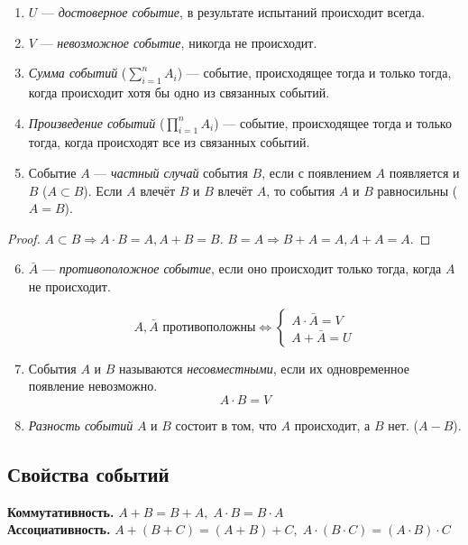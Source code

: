 \begin{enumerate}
	\item $U$ --- \textit{достоверное событие}, в результате испытаний происходит всегда.
	\item $V$ --- \textit{невозможное событие}, никогда не происходит.
	\item \textit{Сумма событий} ($\sum\limits_{i=1}^n A_i$) --- событие, происходящее тогда и только тогда, когда происходит хотя бы одно из связанных событий.
	\item \textit{Произведение событий} ($\prod\limits_{i=1}^n A_i$) --- событие, происходящее тогда и только тогда, когда происходят все из связанных событий.
	\item Событие $A$ --- \textit{частный случай} события $B$, если с появлением $A$ появляется и $B$ ($A \subset B$). Если $A$ влечёт $B$ и $B$ влечёт $A$, то события $A$ и $B$ равносильны ($A = B$).
\end{enumerate}
\begin{proof}
	$A \subset B \Rightarrow A\cdot B = A, A + B = B.$
	$B = A \Rightarrow B + A = A, A + A = A.$
\end{proof}
\begin{enumerate}
	\setcounter{enumi}{5}
	\item $\bar{A}$ --- \textit{противоположное событие}, если оно происходит только тогда, когда $A$ не происходит.

	      \[
		      A  ,  \bar{A} \text{ противоположны} \Leftrightarrow
		      \begin{cases}
			      A\cdot \bar{A} = V \\
			      A + \bar{A} = U
		      \end{cases}
	      \]

	\item События $A$ и $B$ называются \textit{несовместными}, если их одновременное появление невозможно.
	      $$A\cdot B = V$$

	\item \textit{Разность событий} $A$ и $B$ состоит в том, что $A$ происходит, а $B$ нет. ($A - B$).
\end{enumerate}

\subsection{Свойства событий}
\textbf{Коммутативность.} $A + B = B + A, \; A\cdot B = B\cdot A$ \\

\textbf{Ассоциативность.} $A + (B + C)=(A + B) + C, \; A\cdot (B\cdot C) = (A\cdot B)\cdot C$ \\

